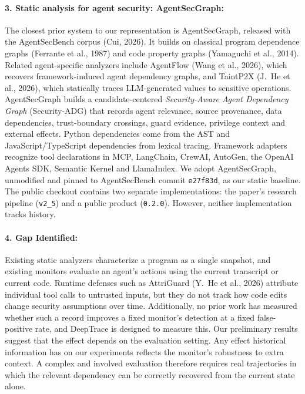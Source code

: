 \documentclass[11pt,letterpaper]{article}
\begin{document}
\paragraph{3. Static analysis for agent security: AgentSecGraph:} The closest prior system to our representation is AgentSecGraph, released with the AgentSecBench corpus (Cui, 2026). It builds on classical program dependence graphs (Ferrante et al., 1987) and code property graphs (Yamaguchi et al., 2014). Related agent-specific analyzers include AgentFlow (Wang et al., 2026), which recovers framework-induced agent dependency graphs, and TaintP2X (J.~He et al., 2026), which statically traces LLM-generated values to sensitive operations. AgentSecGraph builds a candidate-centered \emph{Security-Aware Agent Dependency Graph} (Security-ADG) that records agent relevance, source provenance, data dependencies, trust-boundary crossings, guard evidence, privilege context and external effects. Python dependencies come from the AST and JavaScript/TypeScript dependencies from lexical tracing. Framework adapters recognize tool declarations in MCP, LangChain, CrewAI, AutoGen, the OpenAI Agents SDK, Semantic Kernel and LlamaIndex. We adopt AgentSecGraph, unmodified and pinned to AgentSecBench commit \texttt{e27f83d}, as our static baseline. The public checkout contains two separate implementations: the paper's research pipeline (\texttt{v2\_5}) and a public product (\texttt{0.2.0}). However, neither implementation tracks history.

\paragraph{4. Gap Identified:} Existing static analyzers characterize a program as a single snapshot, and existing monitors evaluate an agent's actions using the current transcript or current code. Runtime defenses such as AttriGuard (Y.~He et al., 2026) attribute individual tool calls to untrusted inputs, but they do not track how code edits change security assumptions over time. Additionally, no prior work has measured whether such a record improves a fixed monitor's detection at a fixed false-positive rate, and DeepTrace is designed to measure this. Our preliminary results suggest that the effect depends on the evaluation setting. Any effect historical information has on our experiments reflects the monitor's robustness to extra context. A complex and involved evaluation therefore requires real trajectories in which the relevant dependency can be correctly recovered from the current state alone.
\end{document}
